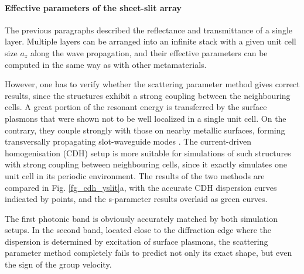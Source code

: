 \paragraph{Effective parameters of the sheet-slit array}%
The previous paragraphs described the reflectance and transmittance of a single layer. Multiple layers can be arranged into an infinite stack with a given unit cell size $a_z$ along the wave propagation, and their effective parameters can be computed in the same way as with other metamaterials. 

However, one has to verify whether the scattering parameter method gives correct results, since the structures exhibit a strong coupling between the neighbouring cells. A great portion of the resonant energy is transferred by the surface plasmons that were shown not to be well localized in a single unit cell. On the contrary, they couple strongly with those on nearby metallic surfaces, forming transversally propagating slot-waveguide modes \cite{weiner2011electromagnetics}.
The current-driven homogenisation (CDH) setup is more suitable for simulations of such structures  with strong coupling between neighbouring cells, since it exactly simulates one unit cell in its periodic environment. The results of the two methods are compared in Fig. \ref{fg_cdh_yslit}a, with the accurate CDH dispersion curves indicated by points, and the s-parameter results overlaid as green curves.

The first photonic band is obviously accurately matched by both simulation setups. In the second band, located close to the diffraction edge where the dispersion is determined by excitation of surface plasmons, the scattering parameter method completely fails to predict not only its exact shape, but even the sign of the group velocity. 


